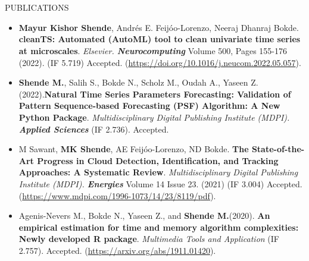 \documentclass{my_cv}
\begin{document}
%
%
%
%


\section{\faStar}{PUBLICATIONS}

	\begin{itemize}
		\item \textbf{Mayur Kishor Shende}, Andrés E. Feijóo-Lorenzo, Neeraj Dhanraj Bokde. \textbf{cleanTS: Automated (AutoML) tool to clean univariate time series at microscales}. \emph{Elsevier. \textbf{Neurocomputing}} Volume 500, Pages 155-176 (2022). (IF 5.719) Accepted. (\url{https://doi.org/10.1016/j.neucom.2022.05.057}).
		
		\item \textbf{Shende M.}, Salih S., Bokde N., Scholz M., Oudah A., Yaseen Z. (2022).\textbf{Natural Time Series Parameters Forecasting: Validation of Pattern Sequence-based Forecasting (PSF) Algorithm: A New Python Package}.  \emph{Multidisciplinary Digital Publishing Institute (MDPI). \textbf{Applied Sciences}} (IF 2.736). Accepted.
		
		\item M Sawant, \textbf{MK Shende}, AE Feijóo-Lorenzo, ND Bokde. \textbf{The State-of-the-Art Progress in Cloud Detection, Identification, and Tracking Approaches: A Systematic Review}. \emph{Multidisciplinary Digital Publishing Institute (MDPI). \textbf{Energies}} Volume 14 Issue 23. (2021) (IF 3.004) Accepted. (\url{https://www.mdpi.com/1996-1073/14/23/8119/pdf}). 
		
		\item Agenis-Nevers M., Bokde N., Yaseen Z., and \textbf{Shende M.}(2020). \textbf{An empirical estimation for time and memory algorithm complexities: Newly developed R package}. \emph{Multimedia Tools and Application} (IF 2.757). Accepted. (\url{https://arxiv.org/abs/1911.01420}).
		
	\end{itemize}
\end{document}
